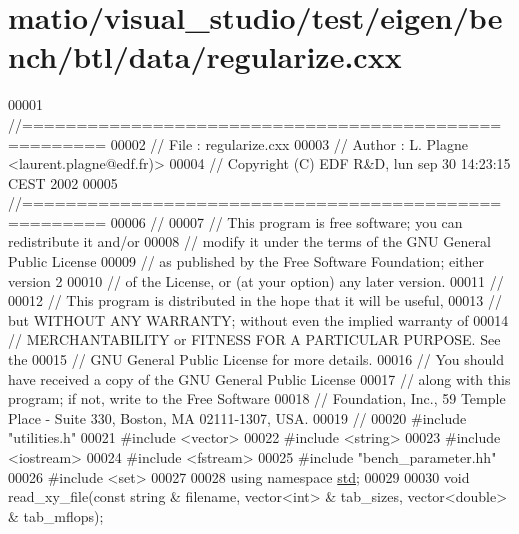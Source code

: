 \hypertarget{matio_2visual__studio_2test_2eigen_2bench_2btl_2data_2regularize_8cxx_source}{}\section{matio/visual\+\_\+studio/test/eigen/bench/btl/data/regularize.cxx}
\label{matio_2visual__studio_2test_2eigen_2bench_2btl_2data_2regularize_8cxx_source}

\begin{DoxyCode}
00001 \textcolor{comment}{//=====================================================}
00002 \textcolor{comment}{// File   :  regularize.cxx}
00003 \textcolor{comment}{// Author :  L. Plagne <laurent.plagne@edf.fr)>        }
00004 \textcolor{comment}{// Copyright (C) EDF R&D,  lun sep 30 14:23:15 CEST 2002}
00005 \textcolor{comment}{//=====================================================}
00006 \textcolor{comment}{// }
00007 \textcolor{comment}{// This program is free software; you can redistribute it and/or}
00008 \textcolor{comment}{// modify it under the terms of the GNU General Public License}
00009 \textcolor{comment}{// as published by the Free Software Foundation; either version 2}
00010 \textcolor{comment}{// of the License, or (at your option) any later version.}
00011 \textcolor{comment}{// }
00012 \textcolor{comment}{// This program is distributed in the hope that it will be useful,}
00013 \textcolor{comment}{// but WITHOUT ANY WARRANTY; without even the implied warranty of}
00014 \textcolor{comment}{// MERCHANTABILITY or FITNESS FOR A PARTICULAR PURPOSE.  See the}
00015 \textcolor{comment}{// GNU General Public License for more details.}
00016 \textcolor{comment}{// You should have received a copy of the GNU General Public License}
00017 \textcolor{comment}{// along with this program; if not, write to the Free Software}
00018 \textcolor{comment}{// Foundation, Inc., 59 Temple Place - Suite 330, Boston, MA  02111-1307, USA.}
00019 \textcolor{comment}{// }
00020 \textcolor{preprocessor}{#include "utilities.h"}
00021 \textcolor{preprocessor}{#include <vector>}
00022 \textcolor{preprocessor}{#include <string>}
00023 \textcolor{preprocessor}{#include <iostream>}
00024 \textcolor{preprocessor}{#include <fstream>}
00025 \textcolor{preprocessor}{#include "bench\_parameter.hh"}
00026 \textcolor{preprocessor}{#include <set>}
00027 
00028 \textcolor{keyword}{using namespace }\hyperlink{namespacestd}{std};
00029 
00030 \textcolor{keywordtype}{void} read\_xy\_file(\textcolor{keyword}{const} \textcolor{keywordtype}{string} & filename, vector<int> & tab\_sizes, vector<double> & tab\_mflops);

\end{DoxyCode}
